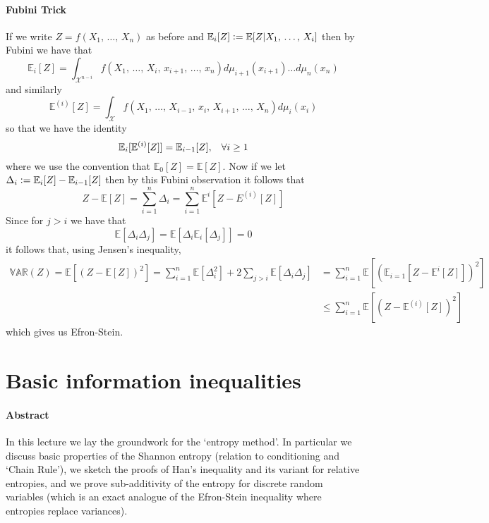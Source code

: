 \documentclass[reqno]{amsproc}
\newcommand{\defeq}{\vcentcolon=} %
\newcommand{\E}{\mathbb{E}} %
\newcommand{\var}{\mathbb{VAR}} %
\begin{document}
\paragraph{\textbf{Fubini Trick}}
\label{rmk:Fubini}
	If we write $Z = f(X_1,\,\dots,\,X_n)$ as before and 
	$\E_i[Z] \defeq \E[Z|X_1,\,\dots,\,X_i]$ then by Fubini we have that 
	$$\E_i[Z] = \int_{\mathcal{X}^{n-i}} f(X_1,\,\dots,\,X_i,\,x_{i+1},\,\dots,\,x_{n})d\mu_{i+1}(x_{i+1})\dots d\mu_n(x_{n})$$ and similarly
	$$\E^{(i)}[Z] = \int_\mathcal{X} f(X_1,\,\dots,\,X_{i-1},\,x_i,\,X_{i+1},\,\dots,\,X_n)d\mu_i(x_i)$$ so that we have the identity
	$$\E_i[\E^{(i)}[Z]] = \E_{i-1}[Z], \hspace{0.3 cm} \forall i \geq 1$$
	where we use the convention that $\E_0[Z] = \E[Z]$. Now if we let $\Delta_i \defeq \E_i[Z] - \E_{i-1}[Z]$ then by this Fubini observation it follows that 
	$$Z - \E[Z] = \sum\limits_{i=1}^n \Delta_i = \sum\limits_{i=1}^n \E^i[Z - E^{(i)}[Z]]$$ 
	Since for $j > i$ we have that
	$$\E[\Delta_i\Delta_j] = \E[\Delta_i\E_i[\Delta_j]] = 0$$ it follows that, using Jensen's inequality,
	\begin{align*}
		\var(Z)
		= \E[(Z-\E[Z])^2]
		= \sum\limits_{i=1}^n \E[\Delta_i^2] + 2\sum\limits_{j>i}\E[\Delta_i\Delta_j]
		&= \sum\limits_{i=1}^n \E[(\E_{i=1}[Z - \E^{i}[Z]])^2]\\
		&\leq\sum\limits_{i=1}^n \E[(Z - \E^{(i)}[Z])^2]
	\end{align*}
	which gives us Efron-Stein.  


\section{Basic information inequalities}
\label{sec:bas_inf_ineq}
\paragraph{\textbf{Abstract}}
	In this lecture we lay the groundwork for the `entropy method'.
	In particular we discuss basic properties of the Shannon entropy (relation to conditioning and `Chain Rule'),
	we sketch the proofs of Han's inequality and its variant for relative entropies,
	and we prove sub-additivity of the entropy for discrete random variables
	(which is an exact analogue of the Efron-Stein inequality where entropies replace variances).
\end{document}
